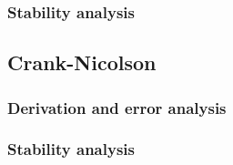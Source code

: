 \documentclass[12pt,english,a4paper]{article}
\begin{document}
\subsubsection{Stability analysis}



%
\subsection{Crank-Nicolson}

\subsubsection{Derivation and error analysis}

\subsubsection{Stability analysis}




\clearpage
{}
\printbibliography
\end{document}
